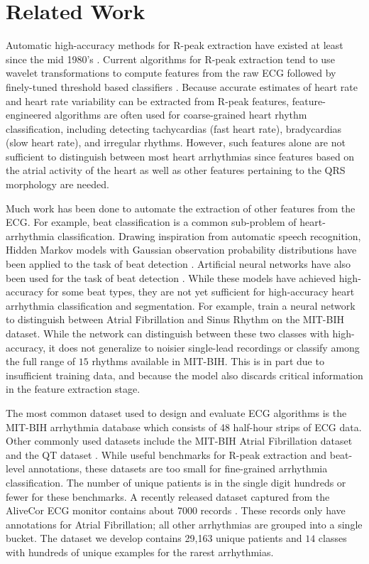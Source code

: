 \documentclass{article}
\begin{document}
\section{Related Work}
\label{related}
Automatic high-accuracy methods for R-peak extraction have existed at least since the mid 1980's \cite{pan1985real}. Current algorithms for R-peak extraction tend to use wavelet transformations to compute features from the raw ECG followed by finely-tuned threshold based classifiers \cite{li1995detection, martinez2004wavelet}. Because accurate estimates of heart rate and heart rate variability can be extracted from R-peak features, feature-engineered algorithms are often used for coarse-grained heart rhythm classification, including detecting tachycardias (fast heart rate), bradycardias (slow heart rate), and irregular rhythms. However, such features alone are not sufficient to distinguish between most heart arrhythmias since features based on the atrial activity of the heart as well as other features pertaining to the QRS morphology are needed.

Much work has been done to automate the extraction of other features from the ECG. For example, beat classification is a common sub-problem of heart-arrhythmia classification. Drawing inspiration from automatic speech recognition, Hidden Markov models with Gaussian observation probability distributions have been applied to the task of beat detection \cite{coast1990approach}. Artificial neural networks have also been used for the task of beat detection \cite{melo2000arrhythmia}. While these models have achieved high-accuracy for some beat types, they are not yet sufficient for high-accuracy heart arrhythmia classification and segmentation. For example, \cite{artis1991detection} train a neural network to distinguish between Atrial Fibrillation and Sinus Rhythm on the MIT-BIH dataset. While the network can distinguish between these two classes with high-accuracy, it does not generalize to noisier single-lead recordings or classify among the full range of $15$ rhythms available in MIT-BIH. This is in part due to insufficient training data, and because the model also discards critical information in the feature extraction stage.

The most common dataset used to design and evaluate ECG algorithms is the MIT-BIH arrhythmia database \cite{moody2001impact} which consists of 48 half-hour strips of ECG data. Other commonly used datasets include the MIT-BIH Atrial Fibrillation dataset \cite{moody1983new} and the QT dataset \cite{laguna1997database}. While useful benchmarks for R-peak extraction and beat-level annotations, these datasets are too small for fine-grained arrhythmia classification. The number of unique patients is in the single digit hundreds or fewer for these benchmarks. A recently released dataset captured from the AliveCor ECG monitor contains about 7000 records \cite{clifford2017}. These records only have annotations for Atrial Fibrillation; all other arrhythmias are grouped into a single bucket. The dataset we develop contains 29,163 unique patients and $14$ classes with hundreds of unique examples for the rarest arrhythmias.
\end{document}

